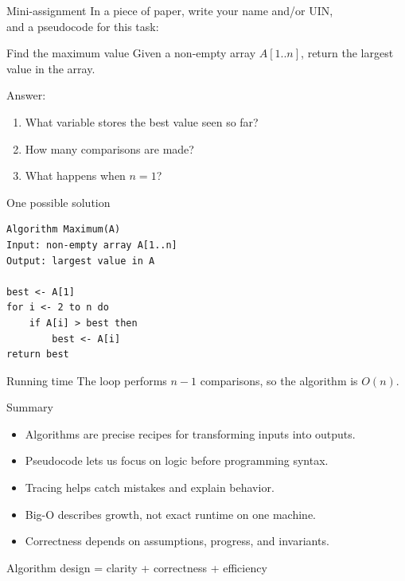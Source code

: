 \documentclass[aspectratio=43,10pt]{beamer}
\begin{document}
\begin{frame}{Mini-assignment}
  In a piece of paper, write your name and/or UIN,\\and a pseudocode for this task:
  \begin{block}{Find the maximum value}
    Given a non-empty array $A[1..n]$, return the largest value in the array.
  \end{block}

  \vspace{0.5em}
  Answer:
  \begin{enumerate}
    \item What variable stores the best value seen so far?
    \item How many comparisons are made?
    \item What happens when $n=1$?
  \end{enumerate}
\end{frame}

\begin{frame}[fragile]{One possible solution}
\begin{lstlisting}[style=pseudo]
Algorithm Maximum(A)
Input: non-empty array A[1..n]
Output: largest value in A

best <- A[1]
for i <- 2 to n do
    if A[i] > best then
        best <- A[i]
return best
\end{lstlisting}

\begin{block}{Running time}
  The loop performs $n-1$ comparisons, so the algorithm is $O(n)$.
\end{block}
\end{frame}

\begin{frame}{Summary}
  \begin{itemize}
    \item Algorithms are precise recipes for transforming inputs into outputs.
    \item Pseudocode lets us focus on logic before programming syntax.
    \item Tracing helps catch mistakes and explain behavior.
    \item Big-O describes growth, not exact runtime on one machine.
    \item Correctness depends on assumptions, progress, and invariants.
  \end{itemize}

  \vspace{0.8em}
  \begin{center}
    \large Algorithm design = clarity + correctness + efficiency
  \end{center}
\end{frame}
\end{document}
